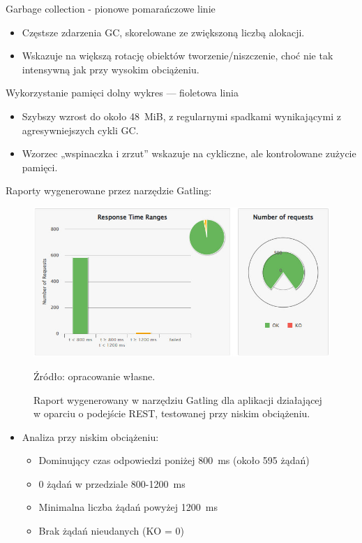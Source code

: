 \documentclass[runningheads,12pt]{llncs}
\begin{document}
Garbage collection - pionowe pomarańczowe linie

\begin{itemize}
  \item Częstsze zdarzenia GC, skorelowane ze zwiększoną liczbą alokacji.
  \item Wskazuje na większą rotację obiektów tworzenie/niszczenie, choć nie tak intensywną jak przy wysokim obciążeniu.
\end{itemize}

Wykorzystanie pamięci dolny wykres — fioletowa linia

\begin{itemize}
  \item Szybszy wzrost do około 48~MiB, z regularnymi spadkami wynikającymi z agresywniejszych cykli GC.
  \item Wzorzec „wspinaczka i zrzut” wskazuje na cykliczne, ale kontrolowane zużycie pamięci.
\end{itemize}

\newpage

Raporty wygenerowane przez narzędzie Gatling:


\begin{figure}
    \includegraphics[width=\linewidth]{images/rest-gatling-low-graph.jpg}
    \caption{Raport wygenerowany w narzędziu Gatling dla aplikacji działającej w oparciu o podejście REST, testowanej przy niskim obciążeniu.} \label{fig1}
    \vspace{0.5em}
    {\small Źródło: opracowanie własne.}
\end{figure}

\begin{itemize}
  \item Analiza przy niskim obciążeniu:
  \begin{itemize}
    \item Dominujący czas odpowiedzi poniżej 800~ms (około 595 żądań)
    \item 0 żądań w przedziale 800-1200~ms
    \item Minimalna liczba żądań powyżej 1200~ms
    \item Brak żądań nieudanych (KO = 0)
  \end{itemize}
\end{itemize}
\end{document}
